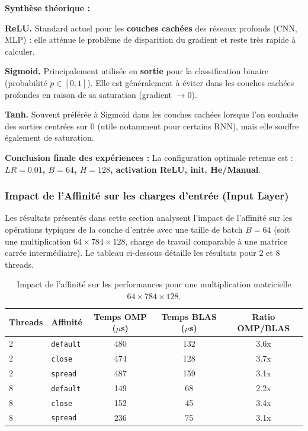 \documentclass[a4paper,11pt]{article}
\begin{document}
\textbf{Synthèse théorique :}
\par\smallskip
\noindent\textbf{ReLU.} Standard actuel pour les \textbf{couches cachées} des réseaux profonds (CNN, MLP) : elle atténue le problème de disparition du gradient et reste très rapide à calculer.
\par\smallskip
\noindent\textbf{Sigmoid.} Principalement utilisée en \textbf{sortie} pour la classification binaire (probabilité $p \in [0,1]$). Elle est généralement à éviter dans les couches cachées profondes en raison de sa saturation (gradient $\to 0$).
\par\smallskip
\noindent\textbf{Tanh.} Souvent préférée à Sigmoid dans les couches cachées lorsque l'on souhaite des sorties centrées sur 0 (utile notamment pour certains RNN), mais elle souffre également de saturation.

\textbf{Conclusion finale des expériences :}
La configuration optimale retenue est : \textbf{$LR=0.01$, $B=64$, $H=128$, activation ReLU, init. He/Manual}.

\subsubsection{Impact de l'Affinité sur les charges d'entrée (Input Layer)}

Les résultats présentés dans cette section analysent l'impact de l'affinité sur les opérations typiques de la couche d'entrée avec une taille de batch $B=64$ (soit une multiplication $64 \times 784 \times 128$, charge de travail comparable à une matrice carrée intermédiaire). Le tableau ci-dessous détaille les résultats pour 2 et 8 threads.

\begin{table}[H]
    \centering
    \caption{Impact de l'affinité sur les performances pour une multiplication matricielle $64 \times 784 \times 128$.}
    \label{tab:affinity}
    \begin{tabular}{llccc}
        \toprule
        \textbf{Threads} & \textbf{Affinité} & \textbf{Temps OMP ($\mu$s)} & \textbf{Temps BLAS ($\mu$s)} & \textbf{Ratio OMP/BLAS} \\
        \midrule
        2 & \texttt{default} & 480 & 132 & 3.6x \\
        2 & \texttt{close} & 474 & 128 & 3.7x \\
        2 & \texttt{spread} & 487 & 159 & 3.1x \\
        \midrule
        8 & \texttt{default} & 149 & 68 & 2.2x \\
        8 & \texttt{close} & 152 & 45 & 3.4x \\
        8 & \texttt{spread} & 236 & 75 & 3.1x \\
        \bottomrule
    \end{tabular}
\end{table}
\end{document}
